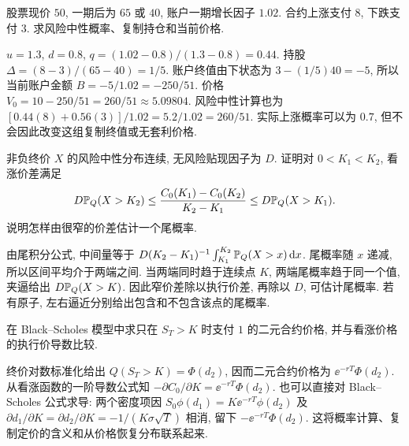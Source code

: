 \begin{exercise}
股票现价 $50$, 一期后为 $65$ 或 $40$, 账户一期增长因子 $1.02$. 合约上涨支付 $8$, 下跌支付 $3$. 求风险中性概率、复制持仓和当前价格.
\end{exercise}
\begin{solution}
$u=1.3$, $d=0.8$, $q=(1.02-0.8)/(1.3-0.8)=0.44$. 持股
$\Delta=(8-3)/(65-40)=1/5$. 账户终值由下状态为
$3-(1/5)40=-5$, 所以当前账户金额 $B=-5/1.02=-250/51$.
价格 $V_0=10-250/51=260/51\approx5.09804$.
风险中性计算也为
$[0.44(8)+0.56(3)]/1.02=5.2/1.02=260/51$.
实际上涨概率可以为 $0.7$, 但不会因此改变这组复制终值或无套利价格.
\end{solution}

\begin{exercise}
非负终价 $X$ 的风险中性分布连续, 无风险贴现因子为 $D$. 证明对 $0<K_1<K_2$, 看涨价差满足
\[
 D\mathbb P_Q(X>K_2)\leq
 \frac{C_0(K_1)-C_0(K_2)}{K_2-K_1}
 \leq D\mathbb P_Q(X>K_1).
\]
说明怎样由很窄的价差估计一个尾概率.
\end{exercise}
\begin{solution}
由尾积分公式, 中间量等于
$D(K_2-K_1)^{-1}\int_{K_1}^{K_2}\mathbb P_Q(X>x)\,\mathrm d x$.
尾概率随 $x$ 递减, 所以区间平均介于两端之间. 当两端同时趋于连续点 $K$, 两端尾概率趋于同一个值, 夹逼给出 $D\mathbb P_Q(X>K)$. 因此窄价差除以执行价差, 再除以 $D$, 可估计尾概率. 若有原子, 左右逼近分别给出包含和不包含该点的尾概率.
\end{solution}

\begin{exercise}
在 Black--Scholes 模型中求只在 $S_T>K$ 时支付 $1$ 的二元合约价格, 并与看涨价格的执行价导数比较.
\end{exercise}
\begin{solution}
终价对数标准化给出 $Q(S_T>K)=\Phi(d_2)$, 因而二元合约价格为 $\ee^{-rT}\Phi(d_2)$.
从看涨函数的一阶导数公式知
$-\partial C_0/\partial K=\ee^{-rT}\Phi(d_2)$.
也可以直接对 Black--Scholes 公式求导: 两个密度项因
$S_0\phi(d_1)=K\ee^{-rT}\phi(d_2)$ 及
$\partial d_1/\partial K=\partial d_2/\partial K=-1/(K\sigma\sqrt T)$ 相消, 留下 $-\ee^{-rT}\Phi(d_2)$. 这将概率计算、复制定价的含义和从价格恢复分布联系起来.
\end{solution}
